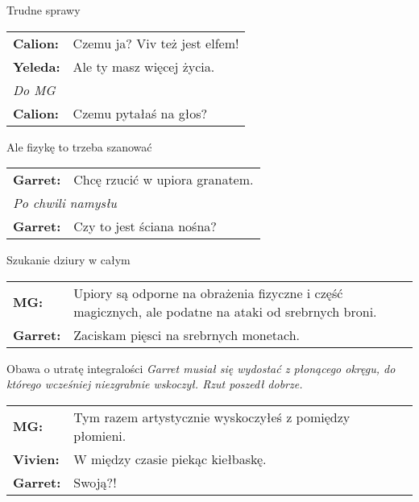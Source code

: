 \documentclass[10pt,twoside,twocolumn]{book}
\begin{document}
\begin{rpg-quotebox}{Trudne sprawy}
   \begin{tabularx}{\columnwidth}{lX}
      \textbf{Calion:} & Czemu ja? Viv też jest elfem!\\
      \textbf{Yeleda:} & Ale ty masz więcej życia.\\
      \multicolumn{2}{l}{\textit{Do MG}}\\
      \textbf{Calion:} & Czemu pytałaś na głos?\\
   \end{tabularx}
\end{rpg-quotebox}

\begin{rpg-quotebox}{Ale fizykę to trzeba szanować}
   \begin{tabularx}{\columnwidth}{lX}
      \textbf{Garret:} & Chcę rzucić w upiora granatem.\\
      \multicolumn{2}{l}{\textit{Po chwili namysłu}}\\
      \textbf{Garret:} & Czy to jest ściana nośna?\\
   \end{tabularx}
\end{rpg-quotebox}

\begin{rpg-quotebox}{Szukanie dziury w całym}
   \begin{tabularx}{\columnwidth}{lX}
      \textbf{MG:} & Upiory są odporne na obrażenia fizyczne i część magicznych, ale podatne na ataki od srebrnych broni.\\
      \textbf{Garret:} & Zaciskam pięsci na srebrnych monetach.\\
   \end{tabularx}
\end{rpg-quotebox}

\begin{rpg-quotebox}{Obawa o utratę integralości}
   \textit{Garret musiał się wydostać z płonącego okręgu, do którego wcześniej niezgrabnie wskoczył. Rzut poszedł dobrze.}\\

   \begin{tabularx}{\columnwidth}{lX}
      \textbf{MG:} & Tym razem artystycznie wyskoczyłeś z pomiędzy płomieni.\\
      \textbf{Vivien:} & W między czasie piekąc kiełbaskę.\\
      \textbf{Garret:} & Swoją?!\\
   \end{tabularx}
\end{rpg-quotebox}
\end{document}

